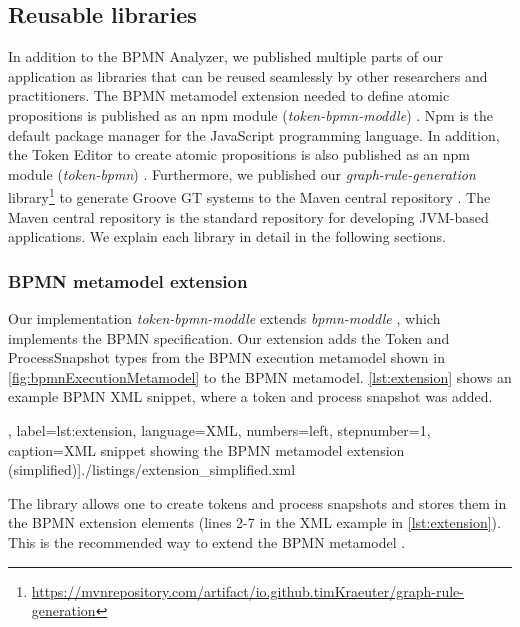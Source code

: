 \documentclass{lmcs} %
\begin{document}
\subsection{Reusable libraries}
In addition to the BPMN Analyzer, we published multiple parts of our application as libraries that can be reused seamlessly by other researchers and practitioners.
The BPMN metamodel extension needed to define atomic propositions is published as an npm module (\textit{token-bpmn-moddle}) \cite{timkrauterLMCS2024Artifacts2023}.
Npm is the default package manager for the JavaScript programming language.
In addition, the Token Editor to create atomic propositions is also published as an npm module (\textit{token-bpmn}) \cite{timkrauterLMCS2024Artifacts2023}.
Furthermore, we published our \textit{graph-rule-generation} library\footnote{\url{https://mvnrepository.com/artifact/io.github.timKraeuter/graph-rule-generation}} to generate Groove GT systems to the Maven central repository \cite{timkrauterLMCS2024Artifacts2023}.
The Maven central repository is the standard repository for developing JVM-based applications.
We explain each library in detail in the following sections.

\subsubsection{BPMN metamodel extension}
Our implementation \textit{token-bpmn-moddle} \cite{timkrauterLMCS2024Artifacts2023} extends \textit{bpmn-moddle} \cite{camundaservicesgmbhBpmnmoddle2023}, which implements the BPMN specification.
Our extension adds the \textsf{Token} and \textsf{ProcessSnapshot} types from the BPMN execution metamodel shown in \autoref{fig:bpmnExecutionMetamodel} to the BPMN metamodel.
\autoref{lst:extension} shows an example BPMN XML snippet, where a token and process snapshot was added.

\smaller\ttfamily, label=lst:extension, language=XML, numbers=left,
    stepnumber=1, caption=XML snippet showing the BPMN metamodel extension (simplified)]{./listings/extension_simplified.xml}

The library allows one to create tokens and process snapshots and stores them in the BPMN extension elements (lines 2-7 in the XML example in \autoref{lst:extension}).
This is the recommended way to extend the BPMN metamodel \cite{objectmanagementgroupBusinessProcessModel2013}.
\end{document}
